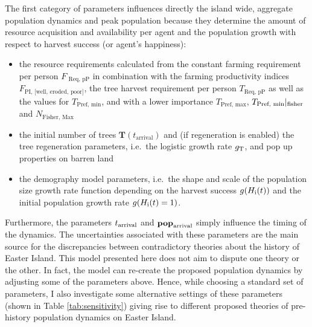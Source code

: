 The first category of parameters influences directly the island wide, aggregate population dynamics and peak population because they determine the amount of resource acquisition and availability per agent and the population growth with respect to harvest success (or agent's happiness): 
\begin{itemize}
	\item the resource requirements calculated from the constant farming requirement per person $F_\text{ Req, pP}$ in combination with the farming productivity indices $F_\text{PI, [well, eroded, poor]}$, the tree harvest requirement per person $T_\text{Req, pP}$ as well as the values for $T_\text{Pref, min}$, and with a lower importance $T_\text{Pref, max}$, $T_\text{Pref, min}|_{\rm fisher}$ and $N_\text{Fisher, Max}$
	\item the initial number of trees $\mathbf{T}(t_\text{arrival})$ and (if regeneration is enabled) the tree regeneration parameters, i.e.\ the logistic growth rate $g_{\rm T}$, and pop up properties on barren land 
	\item the demography model parameters, i.e.\ the shape and scale of the population size growth rate function depending on the harvest success $g(H_{\rm i}(t))$ and the initial population growth rate $g(H_{\rm i}(t)=1)$.
\end{itemize}
Furthermore, the parameters $t_{\rm arrival}$ and $\mathbf{pop}_{\rm arrival}$ simply influence the timing of the dynamics.
The uncertainties associated with these parameters are the main source for the  
discrepancies between contradictory theories about the history of Easter Island.
This model presented here does not aim to dispute one theory or the other.
In fact, the model can re-create the proposed population dynamics by adjusting some of the parameters above.
Hence, while choosing a standard set of parameters, I also investigate some alternative settings of these parameters (shown in Table \ref{tab:sensitivity}) giving rise to different proposed theories of pre-history population dynamics on Easter Island.

